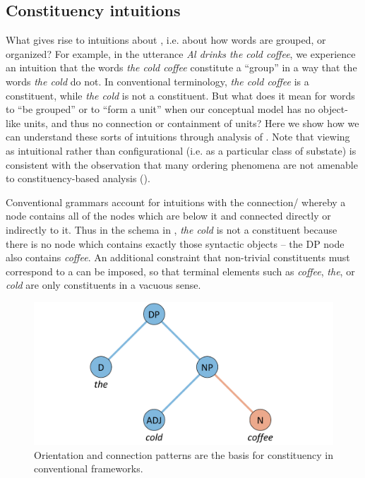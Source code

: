 \subsection{Constituency intuitions}

What gives rise to intuitions about , i.e. about how words are grouped, or organized? For example, in the utterance \textit{Al drinks the cold coffee}, we experience an intuition that the words \textit{the cold coffee} constitute a “group” in a way that the words \textit{the cold} do not. In conventional terminology, \textit{the cold coffee} is a constituent, while \textit{the cold} is not a constituent. But what does it mean for words to “be grouped” or to “form a unit” when our conceptual model has no object-like units, and thus no connection or containment of units? Here we show how we can understand these sorts of intuitions through analysis of . Note that viewing  as intuitional rather than configurational (i.e. as a particular class of substate) is consistent with the observation that many ordering phenomena are not amenable to constituency-based analysis (\citealt{Langacker1997,Phillips2003}).

  Conventional  grammars account for  intuitions with the connection/ whereby a node contains all of the nodes which are below it and connected directly or indirectly to it. Thus in the schema in {}, \textit{the cold} is not a constituent because there is no node which contains exactly those syntactic objects -- the DP node also contains \textit{coffee}. An additional constraint that non-trivial constituents must correspond to a  can be imposed, so that terminal elements such as \textit{coffee}, \textit{the}, or \textit{cold} are only constituents in a vacuous sense. 

  
\begin{figure}
\includegraphics[width=\textwidth]{figures/Tilsen-img136.png}
\caption{Orientation and connection patterns are the basis for constituency in conventional frameworks.}
\label{fig:6:17}
\end{figure}
 

